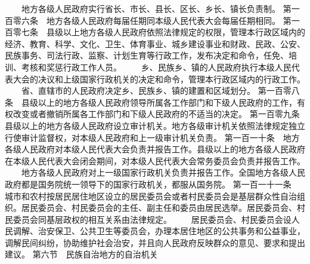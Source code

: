 　　地方各级人民政府实行省长、市长、县长、区长、乡长、镇长负责制。
     第一百零六条　地方各级人民政府每届任期同本级人民代表大会每届任期相同。
     第一百零七条　县级以上地方各级人民政府依照法律规定的权限，管理本行政区域内的经济、教育、科学、文化、卫生、体育事业、城乡建设事业和财政、民政、公安、民族事务、司法行政、监察、计划生育等行政工作，发布决定和命令，任免、培训、考核和奖惩行政工作人员。
 　　乡、民族乡、镇的人民政府执行本级人民代表大会的决议和上级国家行政机关的决定和命令，管理本行政区域内的行政工作。
　　省、直辖市的人民政府决定乡、民族乡、镇的建置和区域划分。
     第一百零八条　县级以上的地方各级人民政府领导所属各工作部门和下级人民政府的工作，有权改变或者撤销所属各工作部门和下级人民政府的不适当的决定。
     第一百零九条　县级以上的地方各级人民政府设立审计机关。地方各级审计机关依照法律规定独立行使审计监督权，对本级人民政府和上一级审计机关负责。
     第一百一十条　地方各级人民政府对本级人民代表大会负责并报告工作。县级以上的地方各级人民政府在本级人民代表大会闭会期间，对本级人民代表大会常务委员会负责并报告工作。
 　　地方各级人民政府对上一级国家行政机关负责并报告工作。全国地方各级人民政府都是国务院统一领导下的国家行政机关，都服从国务院。
     第一百一十一条　城市和农村按居民居住地区设立的居民委员会或者村民委员会是基层群众性自治组织。居民委员会、村民委员会的主任、副主任和委员由居民选举。居民委员会、村民委员会同基层政权的相互关系由法律规定。
 　　居民委员会、村民委员会设人民调解、治安保卫、公共卫生等委员会，办理本居住地区的公共事务和公益事业，调解民间纠纷，协助维护社会治安，并且向人民政府反映群众的意见、要求和提出建议。   
第六节　民族自治地方的自治机关

